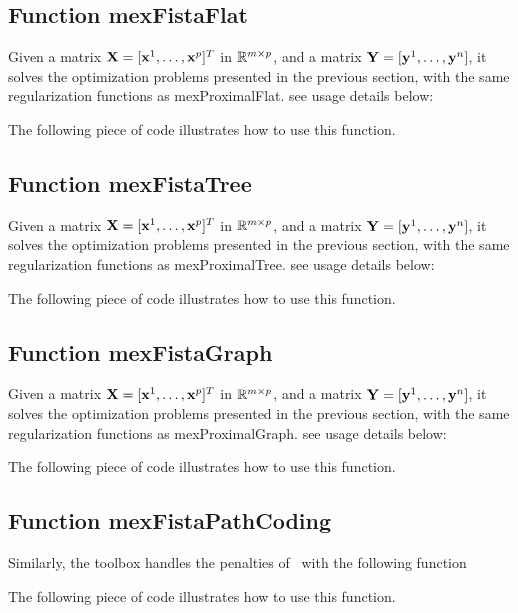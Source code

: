 \documentclass[a4paper, 11pt]{article}
\begin{document}
\subsection{Function mexFistaFlat}
Given a matrix ${\mathbf X}=[{\mathbf x}^1,\ldots,{\mathbf x}^p]^T$ in ${\mathbb R}^{m \times p}$, and a matrix ${\mathbf Y}=[{\mathbf y}^1,\ldots,{\mathbf y}^n]$, it solves the optimization problems presented in the previous section, with the same regularization functions as mexProximalFlat.
see usage details below:

The following piece of code illustrates how to use this function.


%    

\subsection{Function mexFistaTree}
Given a matrix ${\mathbf X}=[{\mathbf x}^1,\ldots,{\mathbf x}^p]^T$ in ${\mathbb R}^{m \times p}$, and a matrix ${\mathbf Y}=[{\mathbf y}^1,\ldots,{\mathbf y}^n]$, it solves the optimization problems presented in the previous section, with the same regularization functions as mexProximalTree.
see usage details below:

%    

The following piece of code illustrates how to use this function.



\subsection{Function mexFistaGraph}
Given a matrix ${\mathbf X}=[{\mathbf x}^1,\ldots,{\mathbf x}^p]^T$ in ${\mathbb R}^{m \times p}$, and a matrix ${\mathbf Y}=[{\mathbf y}^1,\ldots,{\mathbf y}^n]$, it solves the optimization problems presented in the previous section, with the same regularization functions as mexProximalGraph.
see usage details below:

%    

The following piece of code illustrates how to use this function.


\subsection{Function mexFistaPathCoding}
Similarly, the toolbox handles the penalties of~\cite{mairal14} with the following function

The following piece of code illustrates how to use this function.

\end{document}
